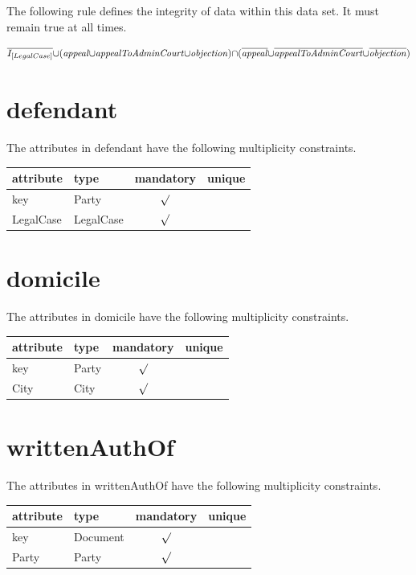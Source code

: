 \documentclass[10pt,a4paper]{report}              %
\theoremstyle{plain}\theorembodyfont{\rmfamily}\newtheorem{definition}{Definition}[section]
\theoremstyle{plain}\theorembodyfont{\rmfamily}\newtheorem{designrule}[definition]{Requirement}
\def\id#1{\mbox{\em #1\/}}
\newcommand{\cmpl}[1]{\overline{#1}}
\begin{document}
The following rule defines the integrity of data within this data set. It must remain true at all times. 

\[\cmpl{I_{[LegalCase]}}{\cup}({\id{appeal}}{\cup}{\id{appealToAdminCourt}}{\cup}{\id{objection}}){\cap}(\cmpl{{\id{appeal}}}{\cup}\cmpl{{\id{appealToAdminCourt}}}{\cup}\cmpl{{\id{objection}}})\]

\section{defendant}

\label{sct:plug defendant}

The attributes in defendant have the following multiplicity constraints. 

\begin{center}
\begin{tabular}{llcc}
attribute & type & mandatory & unique\\
\hline
key  & Party & $\surd$ & \\
LegalCase & LegalCase & $\surd$ & \\
\end{tabular}
\end{center}

\section{domicile}

\label{sct:plug domicile}

The attributes in domicile have the following multiplicity constraints. 

\begin{center}
\begin{tabular}{llcc}
attribute & type & mandatory & unique\\
\hline
key  & Party & $\surd$ & \\
City & City & $\surd$ & \\
\end{tabular}
\end{center}

\section{writtenAuthOf}

\label{sct:plug writtenAuthOf}

The attributes in writtenAuthOf have the following multiplicity constraints. 

\begin{center}
\begin{tabular}{llcc}
attribute & type & mandatory & unique\\
\hline
key  & Document & $\surd$ & \\
Party & Party & $\surd$ & \\
\end{tabular}
\end{center}
\end{document}
